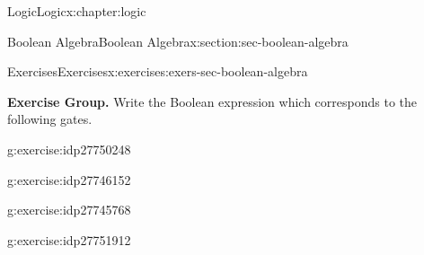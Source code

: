 \documentclass[twoside,10pt,]{book}
\numberwithin{equation}{section}
\begin{document}
\begin{chapterptx}{Logic}{}{Logic}{}{}{x:chapter:logic}
\begin{sectionptx}{Boolean Algebra}{}{Boolean Algebra}{}{}{x:section:sec-boolean-algebra}
\begin{exercises-subsection}{Exercises}{}{Exercises}{}{}{x:exercises:exers-sec-boolean-algebra}
\begin{exercisegroup}
\end{exercisegroup}
\par\medskip\noindent
\par\medskip\noindent%
\textbf{Exercise Group.}\space\space%
Write the Boolean expression which corresponds to the following gates.\begin{exercisegroup}
\begin{divisionexerciseeg}{10}{}{}{g:exercise:idp27750248}%
\begin{image}{0.4}{0.2}{0.4}%
%
\end{image}%
\end{divisionexerciseeg}%
\begin{divisionexerciseeg}{11}{}{}{g:exercise:idp27746152}%
\begin{image}{0.4}{0.2}{0.4}%
%
\end{image}%
\end{divisionexerciseeg}%
\begin{divisionexerciseeg}{12}{}{}{g:exercise:idp27745768}%
\begin{image}{0.4}{0.2}{0.4}%
%
\end{image}%
\end{divisionexerciseeg}%
\begin{divisionexerciseeg}{13}{}{}{g:exercise:idp27751912}%
\begin{image}{0.4}{0.2}{0.4}%
\resizebox{\linewidth}{!}{%
\begin{circuitikz}

\end{circuitikz}}
\end{image}
\end{divisionexerciseeg}
\end{exercisegroup}
\end{exercises-subsection}
\end{sectionptx}
\end{chapterptx}
\end{document}
